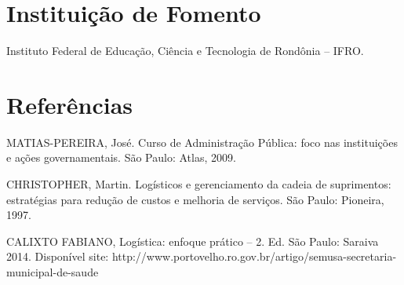 \documentclass[article,12pt,onesidea,4paper,english,brazil]{abntex2}
\begin{document}
\section*{Instituição de Fomento}

Instituto Federal de Educação, Ciência e Tecnologia de Rondônia – IFRO.

\sloppy

\section*{Referências}

\noindent MATIAS-PEREIRA, José. Curso de Administração Pública: foco nas instituições e ações governamentais. São Paulo: Atlas, 2009.

\noindent CHRISTOPHER, Martin. Logísticos e gerenciamento da cadeia de suprimentos: estratégias para redução de custos e melhoria de serviços. São Paulo: Pioneira, 1997.

\noindent CALIXTO FABIANO, Logística: enfoque prático – 2. Ed. São Paulo: Saraiva 2014. Disponível site: http://www.portovelho.ro.gov.br/artigo/semusa-secretaria-municipal-de-saude
\end{document}
